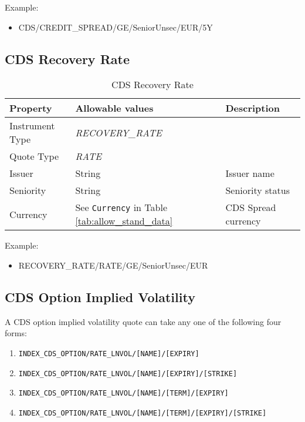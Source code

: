 Example:
\begin{itemize}
\item {CDS/CREDIT\_SPREAD/GE/SeniorUnsec/EUR/5Y}
\end{itemize}

\subsection{CDS Recovery Rate}

\begin{table}[H]
\centering
  \begin{tabular}{|p{3cm}|p{3.5cm}|p{7cm}|}
    \hline
    {\bf Property} & {\bf Allowable values} & {\bf Description} \\ \hline
    Instrument Type & \emph{RECOVERY\_RATE} & \\ \hline
    Quote Type & \emph{RATE} & \\ \hline
    Issuer & String &  Issuer name \\ \hline
    Seniority & String &  Seniority status \\ \hline
    Currency & See \lstinline!Currency! in Table \ref{tab:allow_stand_data} & CDS Spread currency\\ \hline
  \end{tabular}
  \caption{CDS Recovery Rate}
  \label{tab:cdsrecovery_quote}
\end{table}

Example:
\begin{itemize}
\item {RECOVERY\_RATE/RATE/GE/SeniorUnsec/EUR}
\end{itemize}

\subsection{CDS Option Implied Volatility}
\label{md:cds_option_iv}

A CDS option implied volatility quote can take any one of the following four forms:

\begin{enumerate}
\item \lstinline!INDEX_CDS_OPTION/RATE_LNVOL/[NAME]/[EXPIRY]!
\item \lstinline!INDEX_CDS_OPTION/RATE_LNVOL/[NAME]/[EXPIRY]/[STRIKE]!
\item \lstinline!INDEX_CDS_OPTION/RATE_LNVOL/[NAME]/[TERM]/[EXPIRY]!
\item \lstinline!INDEX_CDS_OPTION/RATE_LNVOL/[NAME]/[TERM]/[EXPIRY]/[STRIKE]!
\end{enumerate}


